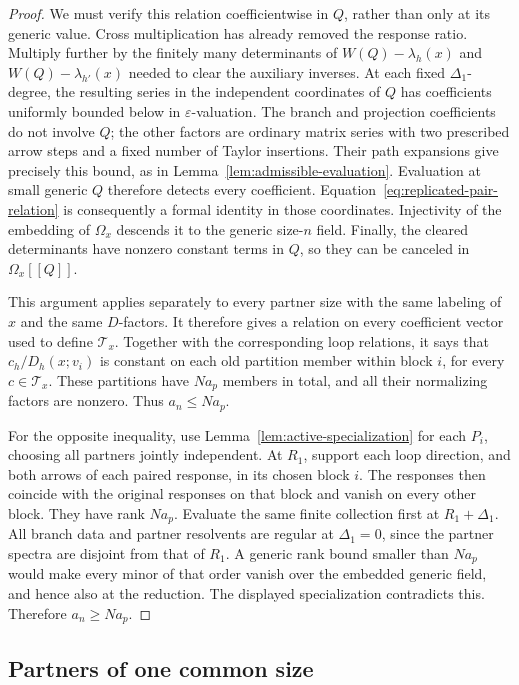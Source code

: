 \documentclass[11pt]{article}
\theoremstyle{definition}
\theoremstyle{remark}
\numberwithin{equation}{section}
\begin{document}
\begin{proof}
We must verify this relation coefficientwise in $Q$, rather than only
at its generic value.  Cross multiplication has already removed the
response ratio.  Multiply further by the finitely many determinants
of $W(Q)-\lambda_h(x)$ and $W(Q)-\lambda_{h'}(x)$ needed to clear
the auxiliary inverses.  At each fixed $\Delta_1$-degree, the resulting
series in the independent coordinates of $Q$ has coefficients
uniformly bounded below in $\varepsilon$-valuation.  The branch and
projection coefficients do not involve $Q$; the other factors are
ordinary matrix series with two prescribed arrow steps and a fixed
number of Taylor insertions.  Their path expansions give precisely
this bound, as in Lemma~\ref{lem:admissible-evaluation}.
Evaluation at small generic $Q$ therefore detects every coefficient.
Equation~\eqref{eq:replicated-pair-relation} is consequently a
formal identity in those coordinates.  Injectivity of the embedding
of $\Omega_x$ descends it to the generic size-$n$ field.  Finally,
the cleared determinants have nonzero constant terms in $Q$, so
they can be canceled in $\Omega_x[[Q]]$.

This argument applies separately to every partner size with the same
labeling of $x$ and the same $D$-factors.  It therefore gives a
relation on every coefficient vector used to define $\mathcal T_x$.
Together with the corresponding loop relations, it says that
$c_h/D_h(x;v_i)$ is constant on each old partition member within
block $i$, for every $c\in\mathcal T_x$.  These partitions have
$Na_p$ members in total, and all their normalizing factors are
nonzero.  Thus $a_n\leq Na_p$.

For the opposite inequality, use
Lemma~\ref{lem:active-specialization} for each $P_i$, choosing all
partners jointly independent.  At $R_1$, support each loop direction,
and both arrows of each paired response, in its chosen block $i$.
The responses then coincide with the original responses on that
block and vanish on every other block.  They have rank $Na_p$.
Evaluate the same finite collection first at $R_1+\Delta_1$.
All branch data and partner resolvents are regular at
$\Delta_1=0$, since the partner spectra are disjoint from that of
$R_1$.  A generic rank bound smaller than $Na_p$ would make every
minor of that order vanish over the embedded generic field, and hence
also at the reduction.  The displayed specialization contradicts this.
Therefore $a_n\geq Na_p$.
\end{proof}

\subsection{Partners of one common size}
\end{document}
